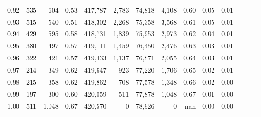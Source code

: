\begin{tabular}{rrrrrrrrrrrrrr}
0.92 &    535 &    604 &  0.53 &  417,787 &    2,783 &  74,818 &   4,108 &  0.60 &  0.05 &      0.01 \\
0.93 &    515 &    540 &  0.51 &  418,302 &    2,268 &  75,358 &   3,568 &  0.61 &  0.05 &      0.01 \\
0.94 &    429 &    595 &  0.58 &  418,731 &    1,839 &  75,953 &   2,973 &  0.62 &  0.04 &      0.01 \\
0.95 &    380 &    497 &  0.57 &  419,111 &    1,459 &  76,450 &   2,476 &  0.63 &  0.03 &      0.01 \\
0.96 &    322 &    421 &  0.57 &  419,433 &    1,137 &  76,871 &   2,055 &  0.64 &  0.03 &      0.01 \\
0.97 &    214 &    349 &  0.62 &  419,647 &      923 &  77,220 &   1,706 &  0.65 &  0.02 &      0.01 \\
0.98 &    215 &    358 &  0.62 &  419,862 &      708 &  77,578 &   1,348 &  0.66 &  0.02 &      0.00 \\
0.99 &    197 &    300 &  0.60 &  420,059 &      511 &  77,878 &   1,048 &  0.67 &  0.01 &      0.00 \\
1.00 &    511 &  1,048 &  0.67 &  420,570 &        0 &  78,926 &       0 &   nan &  0.00 &      0.00 \\
\bottomrule
\end{tabular}
